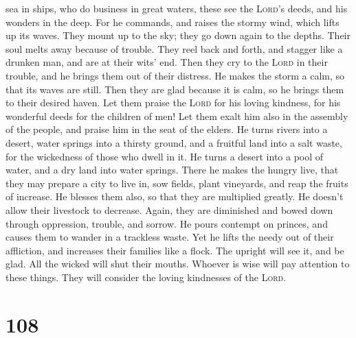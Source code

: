 sea in ships, who do business in great waters,  these see
the \textsc{Lord}'s deeds, and his wonders in the deep. 
For he commands, and raises the stormy wind, which lifts up its waves.
 They mount up to the sky; they go down again to the
depths. Their soul melts away because of trouble.  They
reel back and forth, and stagger like a drunken man, and are at their
wits' end.  Then they cry to the \textsc{Lord} in their
trouble, and he brings them out of their distress.  He
makes the storm a calm, so that its waves are still. 
Then they are glad because it is calm, so he brings them to their
desired haven.  Let them praise the \textsc{Lord} for his
loving kindness, for his wonderful deeds for the children of men!
 Let them exalt him also in the assembly of the people,
and praise him in the seat of the elders.  He turns
rivers into a desert, water springs into a thirsty ground,
 and a fruitful land into a salt waste, for the
wickedness of those who dwell in it.  He turns a desert
into a pool of water, and a dry land into water springs. 
There he makes the hungry live, that they may prepare a city to live in,
 sow fields, plant vineyards, and reap the fruits of
increase.  He blesses them also, so that they are
multiplied greatly. He doesn't allow their livestock to decrease.
 Again, they are diminished and bowed down through
oppression, trouble, and sorrow.  He pours contempt on
princes, and causes them to wander in a trackless waste. 
Yet he lifts the needy out of their affliction, and increases their
families like a flock.  The upright will see it, and be
glad. All the wicked will shut their mouths.  Whoever is
wise will pay attention to these things. They will consider the loving
kindnesses of the \textsc{Lord}.

\hypertarget{section-107}{%
\section{108}\label{section-107}}

